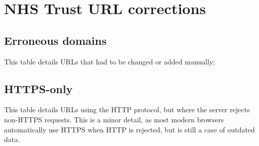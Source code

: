 \appendix

\chapter{NHS Trust URL corrections}\label{app:trusts}
\section{Erroneous domains}
This table details URLs that had to be changed or added manually;


\section{HTTPS-only}
This table details URLs using the HTTP protocol, but where the server rejects non-HTTPS requests. This is a minor detail, as most modern browsers automatically use HTTPS when HTTP is rejected, but is still a case of outdated data.

